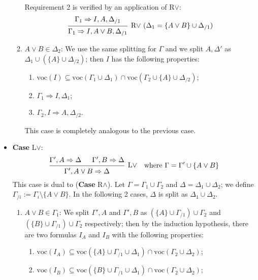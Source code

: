 \documentclass[a4paper]{article}
\newcommand{\voc}{\mathrm{voc}}
\begin{document}
\begin{itemize}
\begin{enumerate}
    Requirement 2 is verified by an application of R$\vee$:
    \[
      \begin{prooftree}
        \hypo{\Gamma_1 \Rightarrow I, A, \Delta_{/1}}
        \infer1[R$\vee$ ($\Delta_1 = \{A \vee B\} \cup \Delta_{/1}$)]{\Gamma_1 \Rightarrow I, A \vee B, \Delta_{/1}}
      \end{prooftree}
    \]
  \item $A \vee B \in \Delta_2$: We use the same splitting for $\Gamma$ and we split $A,\Delta'$ as $\Delta_1 \cup (\{A\} \cup \Delta_{/2})$; then $I$ has the following properties:
    \begin{enumerate}
    \item $\voc(I) \subseteq \voc(\Gamma_1 \cup \Delta_1) \cap \voc(\Gamma_2 \cup \{A\} \cup \Delta_{/2})$;
    \item $\Gamma_1 \Rightarrow I, \Delta_1$;
    \item $\Gamma_2,I \Rightarrow A,\Delta_{/2}$.
    \end{enumerate}
    This case is completely analogous to the previous case.
  \end{enumerate}
\item \textbf{Case} L$\vee$:
  \begin{align*}
    \begin{prooftree}
      \hypo{\Gamma', A \Rightarrow \Delta}
      \hypo{\Gamma', B \Rightarrow \Delta}
      \infer2[L$\vee$]{\Gamma', A \vee B \Rightarrow \Delta}
    \end{prooftree}
    && \text{where $\Gamma = \Gamma' \cup \{A \vee B\}$}
  \end{align*}
  This case is dual to (\textbf{Case} R$\wedge$).
  Let $\Gamma = \Gamma_1 \cup \Gamma_2$ and $\Delta = \Delta_1 \cup \Delta_2$; we define $\Gamma_{/i} := \Gamma_i \setminus \{A \vee B\}$.
  In the following 2 cases, $\Delta$ is split as $\Delta_1 \cup \Delta_2$.
  \begin{enumerate}
  \item $A \vee B \in \Gamma_1$: We split $\Gamma',A$ and $\Gamma',B$ as $(\{A\} \cup \Gamma_{/1}) \cup \Gamma_2$ and  $(\{B\} \cup \Gamma_{/1}) \cup \Gamma_2$ respectively; then by the induction hypothesis, there are two formulas $I_A$ and $I_B$ with the following properties:
    \begin{enumerate}
    \item $\voc(I_A) \subseteq \voc(\{A\} \cup \Gamma_{/1} \cup \Delta_1) \cap \voc(\Gamma_2 \cup \Delta_2)$;
    \item $\voc(I_B) \subseteq \voc(\{B\} \cup \Gamma_{/1} \cup \Delta_1) \cap \voc(\Gamma_2 \cup \Delta_2)$;

\end{enumerate}
\end{enumerate}
\end{itemize}
\end{document}
